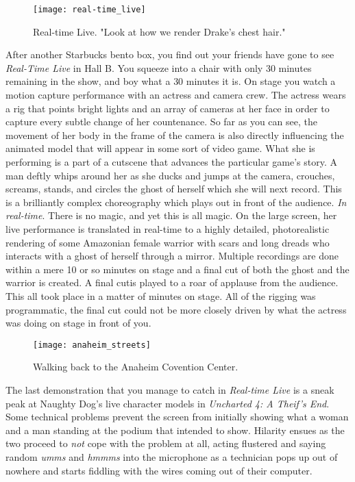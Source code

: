 \documentclass[../main.tex]{subfiles}
\begin{document}
\begin{figure}[h!]
	\centering
	\texttt{[image: real-time\_live]}
	\caption*{Real-time Live. "Look at how we render Drake's chest hair."}
\end{figure}

After another Starbucks bento box, you find out your friends have gone to see \textit{Real-Time Live} in Hall B. You squeeze into a chair with only 30 minutes remaining in the show, and boy what a 30 minutes it is. On stage you watch a motion capture performance with an actress and camera crew. The actress wears a rig that points bright lights and an array of cameras at her face in order to capture every subtle change of her countenance.  So far as you can see, the movement of her body in the frame of the camera is also directly influencing the animated model that will appear in some sort of video game. What she is performing is a part of a cutscene that advances the particular game's story. A man deftly whips around her as she ducks and jumps at the camera, crouches, screams, stands, and circles the ghost of herself which she will next record. This is a brilliantly complex choreography which plays out in front of the audience. \textit{In real-time}. There is no magic, and yet this is all magic. On the large screen, her live performance is translated in real-time to a highly detailed, photorealistic rendering of some Amazonian female warrior with scars and long dreads who interacts with a ghost of herself through a mirror. Multiple recordings are done within a mere 10 or so minutes on stage and a final cut of both the ghost and the warrior is created. A final cutis played to a roar of applause from the audience. This all took place in a matter of minutes on stage. All of the rigging was programmatic, the final cut could not be more closely driven by what the actress was doing on stage in front of you.

\begin{figure}[h!]
	\centering
	\texttt{[image: anaheim\_streets]}
	\caption*{Walking back to the Anaheim Covention Center.}
\end{figure}


The last demonstration that you manage to catch in \textit{Real-time Live} is a sneak peak at Naughty Dog's live character models in \textit{Uncharted 4: A Theif's End}. Some technical problems prevent the screen from initially showing what a woman and a man standing at the podium that intended to show. Hilarity ensues as the two proceed to \textit{not} cope with the problem at all, acting flustered and saying random \textit{umms} and \textit{hmmms} into the microphone as a technician pops up out of nowhere and starts fiddling with the wires coming out of their computer. 
\end{document}
